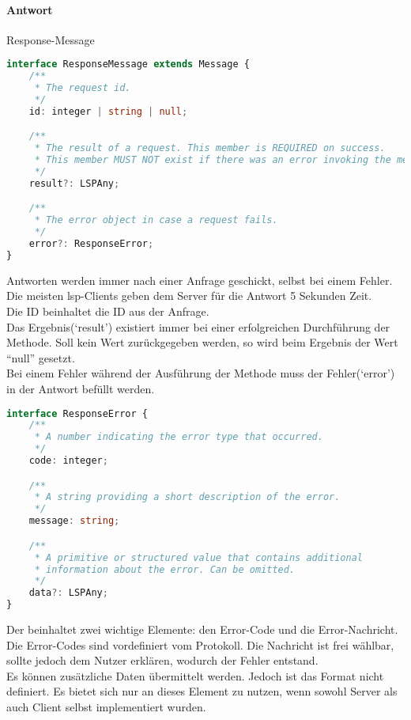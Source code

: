 \documentclass[./einleitung.tex]{subfiles}
\begin{document}
    \paragraph{Antwort}{\footnotesize Response-Message}\\
    \begin{lstlisting}[language=Typescript]
interface ResponseMessage extends Message {
	/**
	 * The request id.
	 */
	id: integer | string | null;

	/**
	 * The result of a request. This member is REQUIRED on success.
	 * This member MUST NOT exist if there was an error invoking the method.
	 */
	result?: LSPAny;

	/**
	 * The error object in case a request fails.
	 */
	error?: ResponseError;
}
    \end{lstlisting}
    Antworten werden immer nach einer Anfrage geschickt, selbst bei einem Fehler.\\
    Die meisten \acrshort{lsp}-Clients geben dem Server für die Antwort 5 Sekunden Zeit.\\
    Die ID beinhaltet die ID aus der Anfrage.\\
    Das Ergebnis(`result') existiert immer bei einer erfolgreichen Durchführung der Methode.
    Soll kein Wert zurückgegeben werden, so wird beim Ergebnis der Wert ``null'' gesetzt.\\
    Bei einem Fehler während der Ausführung der Methode muss der Fehler(`error') in der Antwort befüllt werden.
    \begin{lstlisting}[language=Typescript]
interface ResponseError {
	/**
	 * A number indicating the error type that occurred.
	 */
	code: integer;

	/**
	 * A string providing a short description of the error.
	 */
	message: string;

	/**
	 * A primitive or structured value that contains additional
	 * information about the error. Can be omitted.
	 */
	data?: LSPAny;
}
    \end{lstlisting}
    Der beinhaltet zwei wichtige Elemente: den Error-Code und die Error-Nachricht.
    Die Error-Codes sind vordefiniert vom Protokoll.\cite{response}
    Die Nachricht ist frei wählbar, sollte jedoch dem Nutzer erklären, wodurch der Fehler entstand.\\
    Es können zusätzliche Daten übermittelt werden.
    Jedoch ist das Format nicht definiert.
    Es bietet sich nur an dieses Element zu nutzen, wenn sowohl Server als auch Client selbst implementiert wurden.
\end{document}
